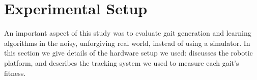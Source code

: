 \section{Experimental Setup}

An important aspect of this study was to evaluate gait generation and
learning algorithms in the noisy, unforgiving real world, instead of
using a simulator.  In this section we give details of the hardware
setup we used:  discusses the robotic
platform, and  describes the tracking system
we used to measure each gait's fitness.





